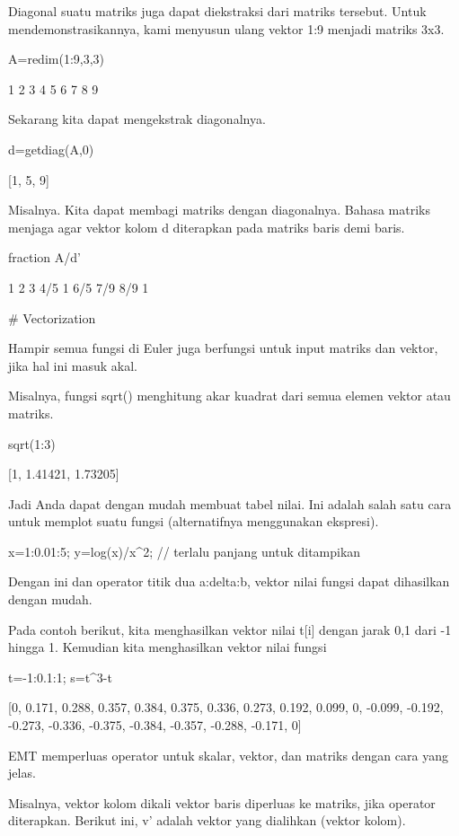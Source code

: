 \documentclass{article}
\begin{document}
Diagonal suatu matriks juga dapat diekstraksi dari matriks tersebut.
Untuk mendemonstrasikannya, kami menyusun ulang vektor 1:9 menjadi
matriks 3x3.


\>A=redim(1:9,3,3)


                1             2             3 
                4             5             6 
                7             8             9 

Sekarang kita dapat mengekstrak diagonalnya.


\>d=getdiag(A,0)


    [1,  5,  9]

Misalnya. Kita dapat membagi matriks dengan diagonalnya. Bahasa
matriks menjaga agar vektor kolom d diterapkan pada matriks baris demi
baris.


\>fraction A/d'


            1         2         3 
          4/5         1       6/5 
          7/9       8/9         1 

# Vectorization

Hampir semua fungsi di Euler juga berfungsi untuk input matriks dan
vektor, jika hal ini masuk akal.


Misalnya, fungsi sqrt() menghitung akar kuadrat dari semua elemen
vektor atau matriks.


\>sqrt(1:3)


    [1,  1.41421,  1.73205]

Jadi Anda dapat dengan mudah membuat tabel nilai. Ini adalah salah
satu cara untuk memplot suatu fungsi (alternatifnya menggunakan
ekspresi).


\>x=1:0.01:5; y=log(x)/x^2; // terlalu panjang untuk ditampikan


Dengan ini dan operator titik dua a:delta:b, vektor nilai fungsi dapat
dihasilkan dengan mudah.


Pada contoh berikut, kita menghasilkan vektor nilai t[i] dengan jarak
0,1 dari -1 hingga 1. Kemudian kita menghasilkan vektor nilai fungsi


\>t=-1:0.1:1; s=t^3-t


    [0,  0.171,  0.288,  0.357,  0.384,  0.375,  0.336,  0.273,  0.192,
    0.099,  0,  -0.099,  -0.192,  -0.273,  -0.336,  -0.375,  -0.384,
    -0.357,  -0.288,  -0.171,  0]

EMT memperluas operator untuk skalar, vektor, dan matriks dengan cara
yang jelas.


Misalnya, vektor kolom dikali vektor baris diperluas ke matriks, jika
operator diterapkan. Berikut ini, v' adalah vektor yang dialihkan
(vektor kolom).
\end{document}
